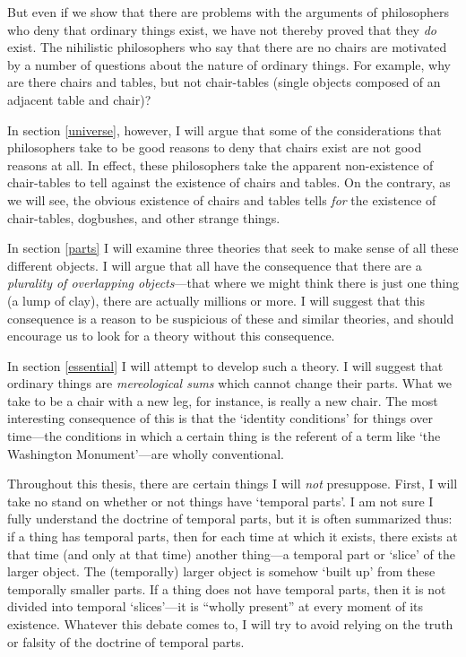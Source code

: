 \documentclass[11pt]{article}
\begin{document}
\begin{spacing}{1.5}
But even if we show that there are problems with the arguments of
philosophers who deny that ordinary things exist, we have not thereby
proved that they {\em do} exist.  The nihilistic philosophers who say
that there are no chairs are motivated by a number of questions about
the nature of ordinary things.  For example, why are there chairs and
tables, but not chair-tables (single objects composed of an adjacent
table and chair)?

In section \ref{universe}, however, I will argue that some of the
considerations that philosophers take to be good reasons to deny that
chairs exist are not good reasons at all.  In effect, these
philosophers take the apparent non-existence of chair-tables to tell
against the existence of chairs and tables.  On the contrary, as we
will see, the obvious existence of chairs and tables tells {\em for}
the existence of chair-tables, dogbushes, and other strange things.

In section \ref{parts} I will examine three theories that seek to make
sense of all these different objects.  I will argue that all have the
consequence that there are a {\em plurality of overlapping
  objects}---that where we might think there is just one thing (a lump
of clay), there are actually millions or more.  I will suggest that
this consequence is a reason to be suspicious of these and similar
theories, and should encourage us to look for a theory without this
consequence.

In section \ref{essential} I will attempt to develop such a theory.  I
will suggest that ordinary things are {\em mereological sums} which
cannot change their parts.  What we take to be a chair with a new leg,
for instance, is really a new chair.  The most interesting consequence
of this is that the `identity conditions' for things over time---the
conditions in which a certain thing is the referent of a term like
`the Washington Monument'---are wholly conventional.

Throughout this thesis, there are certain things I will {\em not}
presuppose.  First, I will take no stand on whether or not things have
`temporal parts'.  I am not sure I fully understand the doctrine of
temporal parts, but it is often summarized thus: if a thing has
temporal parts, then for each time at which it exists, there exists at
that time (and only at that time) another thing---a temporal part or
`slice' of the larger object.  The (temporally) larger object is
somehow `built up' from these temporally smaller parts.  If a thing
does not have temporal parts, then it is not divided into temporal
`slices'---it is ``wholly present'' at every moment of its existence.
Whatever this debate comes to, I will try to avoid relying on the
truth or falsity of the doctrine of temporal parts.


\end{spacing}
\end{document}
